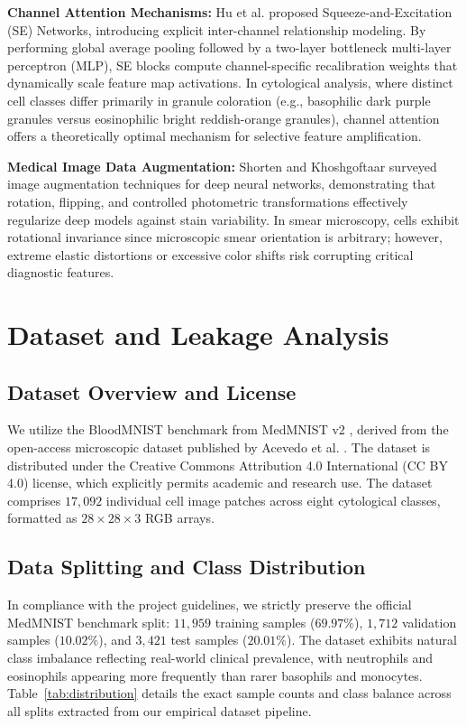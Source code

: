 \documentclass[conference]{IEEEtran}
\begin{document}
\textbf{Channel Attention Mechanisms:} Hu et al. \cite{hu2018squeeze} proposed Squeeze-and-Excitation (SE) Networks, introducing explicit inter-channel relationship modeling. By performing global average pooling followed by a two-layer bottleneck multi-layer perceptron (MLP), SE blocks compute channel-specific recalibration weights that dynamically scale feature map activations. In cytological analysis, where distinct cell classes differ primarily in granule coloration (e.g., basophilic dark purple granules versus eosinophilic bright reddish-orange granules), channel attention offers a theoretically optimal mechanism for selective feature amplification.

\textbf{Medical Image Data Augmentation:} Shorten and Khoshgoftaar \cite{shorten2019survey} surveyed image augmentation techniques for deep neural networks, demonstrating that rotation, flipping, and controlled photometric transformations effectively regularize deep models against stain variability. In smear microscopy, cells exhibit rotational invariance since microscopic smear orientation is arbitrary; however, extreme elastic distortions or excessive color shifts risk corrupting critical diagnostic features.

\section{Dataset and Leakage Analysis}

\subsection{Dataset Overview and License}
We utilize the BloodMNIST benchmark from MedMNIST v2 \cite{yang2023medmnist}, derived from the open-access microscopic dataset published by Acevedo et al. \cite{acevedo2020dataset}. The dataset is distributed under the Creative Commons Attribution 4.0 International (CC BY 4.0) license, which explicitly permits academic and research use. The dataset comprises $17,092$ individual cell image patches across eight cytological classes, formatted as $28 \times 28 \times 3$ RGB arrays.

\subsection{Data Splitting and Class Distribution}
In compliance with the project guidelines, we strictly preserve the official MedMNIST benchmark split: $11,959$ training samples ($69.97\%$), $1,712$ validation samples ($10.02\%$), and $3,421$ test samples ($20.01\%$). The dataset exhibits natural class imbalance reflecting real-world clinical prevalence, with neutrophils and eosinophils appearing more frequently than rarer basophils and monocytes. Table~\ref{tab:distribution} details the exact sample counts and class balance across all splits extracted from our empirical dataset pipeline.
\end{document}
